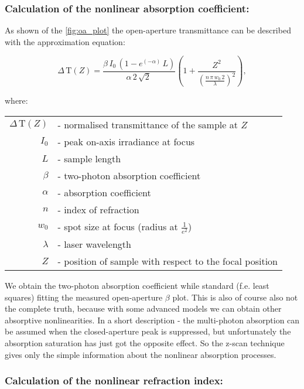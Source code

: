\documentclass[12pt,twoside,a4paper]{article}
\numberwithin{equation}{subsection}
\numberwithin{figure}{subsection}
\begin{document}
\subsubsection*{Calculation of the nonlinear absorption coefficient:}

As shown of the \ref{fig:oa_plot} the open-aperture transmittance can be described with the approximation equation:

\begin{equation}
  \Delta \,\mathrm{T}(Z)=\frac {\beta \,{I_{0}}\,(1 - e^{( - \alpha )}\,L)}{\alpha \,2\,\sqrt{2}\,} 
  \left(  \! 1 + \frac {Z^{2}}{(\frac {n\,\pi \,{w_{0}}\,2}{\lambda })^{2}} \!  \right) ,
\end{equation}
 
where: 

\begin{tabular}{ r l }
   $\Delta \,\mathrm{T}(Z)$ & - normalised transmittance of the sample at $Z$ \\
   ${I_{0}}$ & - peak on-axis irradiance at focus \\
   $L$ & - sample length \\
   $\beta $ & - two-photon absorption coefficient \\
   $\alpha $ & - absorption coefficient \\
   $n$ & - index of refraction \\
   ${w_{0}}$ & - spot size at focus (radius at $\frac {1}{e^{2}}$) \\
   $\lambda $ & - laser wavelength \\
   $Z$ & - position of sample with respect to the focal position \\
\end{tabular}

We obtain the two-photon absorption coefficient while standard (f.e. least squares) fitting the measured open-aperture $\beta $ 
plot. This is also of course also not the complete truth, because with some advanced models we can obtain other absorptive
nonlinearities. In a short description - the multi-photon absorption can be assumed when the closed-aperture peak is suppressed,
but unfortunately the absorption saturation has just got the opposite effect. So the z-scan technique gives only the simple
information about the nonlinear absorption processes.

\subsubsection*{Calculation of the nonlinear refraction index:}
\end{document}
